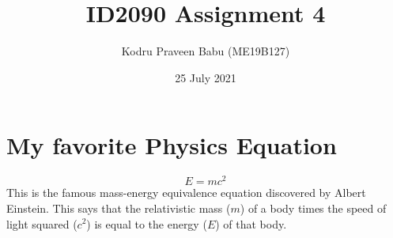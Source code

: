 \documentclass{article}
\title{ID2090 Assignment 4}
\author{Kodru Praveen Babu (ME19B127)}
\date{25 July 2021}
\begin{document}
\maketitle

\section{My favorite Physics Equation}
\[E=mc^2\]
This is the famous mass-energy equivalence equation discovered by Albert Einstein. This says that the relativistic mass ($m$) of a body times the speed of light squared ($c^2$) is equal to the energy ($E$) of that body.
\end{document}
